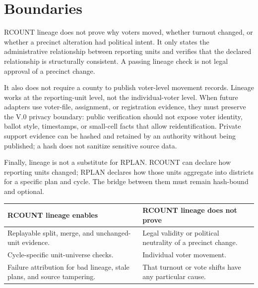 \section{Boundaries}

RCOUNT lineage does not prove why voters moved, whether turnout changed, or
whether a precinct alteration had political intent. It only states the
administrative relationship between reporting units and verifies that the
declared relationship is structurally consistent. A passing lineage check is
not legal approval of a precinct change.

It also does not require a county to publish voter-level movement records.
Lineage works at the reporting-unit level, not the individual-voter level. When
future adapters use voter-file, assignment, or registration evidence, they must
preserve the V.0 privacy boundary: public verification should not expose voter
identity, ballot style, timestamps, or small-cell facts that allow
reidentification. Private support evidence can be hashed and retained by an
authority without being published; a hash does not sanitize sensitive source
data.

Finally, lineage is not a substitute for RPLAN. RCOUNT can declare how reporting
units changed; RPLAN declares how those units aggregate into districts for a
specific plan and cycle. The bridge between them must remain hash-bound and
optional.

\begin{center}
\small
\begin{tabularx}{\textwidth}{XX}
\toprule
RCOUNT lineage enables & RCOUNT lineage does not prove \\
\midrule
Replayable split, merge, and unchanged-unit evidence. & Legal validity or political neutrality of a precinct change. \\
Cycle-specific unit-universe checks. & Individual voter movement. \\
Failure attribution for bad lineage, stale plans, and source tampering. & That turnout or vote shifts have any particular cause. \\
\bottomrule
\end{tabularx}
\end{center}
